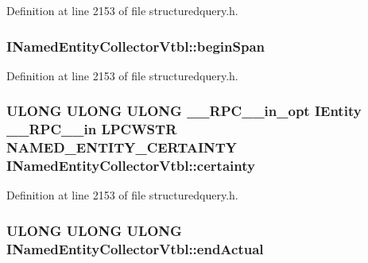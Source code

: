 Definition at line 2153 of file structuredquery.\+h.

\subsubsection[{\texorpdfstring{begin\+Span}{beginSpan}}]{ I\+Named\+Entity\+Collector\+Vtbl\+::begin\+Span}\hypertarget{struct_i_named_entity_collector_vtbl_a1e833f0724588429f63e0d995c8e3661}{}\label{struct_i_named_entity_collector_vtbl_a1e833f0724588429f63e0d995c8e3661}


Definition at line 2153 of file structuredquery.\+h.

\subsubsection[{\texorpdfstring{certainty}{certainty}}]{ {\bf U\+L\+O\+NG} {\bf U\+L\+O\+NG} {\bf U\+L\+O\+NG} {\bf \+\_\+\+\_\+\+R\+P\+C\+\_\+\+\_\+in\+\_\+opt} {\bf I\+Entity} {\bf \+\_\+\+\_\+\+R\+P\+C\+\_\+\+\_\+in} {\bf L\+P\+C\+W\+S\+TR} {\bf N\+A\+M\+E\+D\+\_\+\+E\+N\+T\+I\+T\+Y\+\_\+\+C\+E\+R\+T\+A\+I\+N\+TY} I\+Named\+Entity\+Collector\+Vtbl\+::certainty}\hypertarget{struct_i_named_entity_collector_vtbl_a58f98b2b9c130e531a904928225d6817}{}\label{struct_i_named_entity_collector_vtbl_a58f98b2b9c130e531a904928225d6817}


Definition at line 2153 of file structuredquery.\+h.

\subsubsection[{\texorpdfstring{end\+Actual}{endActual}}]{ {\bf U\+L\+O\+NG} {\bf U\+L\+O\+NG} {\bf U\+L\+O\+NG} I\+Named\+Entity\+Collector\+Vtbl\+::end\+Actual}\hypertarget{struct_i_named_entity_collector_vtbl_a4f4fdd3e987b8bc9969fd8b8569e6cf6}{}\label{struct_i_named_entity_collector_vtbl_a4f4fdd3e987b8bc9969fd8b8569e6cf6}


